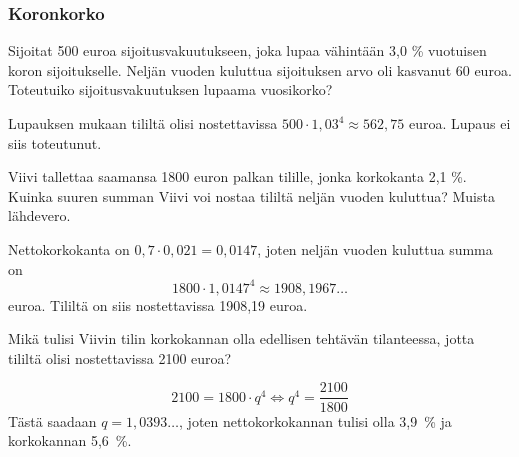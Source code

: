 \documentclass[a4paper,10pt]{article}\usepackage[]{graphicx}\usepackage[]{color}
\begin{document}
\subsubsection*{Koronkorko}

\begin{question} 
    Sijoitat 500 euroa sijoitusvakuutukseen, joka lupaa vähintään 3{,}0 \% vuotuisen koron sijoitukselle.
Neljän vuoden kuluttua sijoituksen arvo oli kasvanut 60 euroa. Toteutuiko sijoitusvakuutuksen lupaama vuosikorko?
\end{question}\begin{solution}
    Lupauksen mukaan tililtä olisi nostettavissa \(500\cdot1,03^4\approx562,75\) euroa. Lupaus ei siis toteutunut.
\end{solution}

\begin{question} 
    Viivi tallettaa saamansa 1800 euron palkan tilille, jonka korkokanta 2,1 \%. Kuinka suuren summan Viivi voi nostaa tililtä
neljän vuoden kuluttua? Muista lähdevero.
\end{question}
\begin{solution}
    Nettokorkokanta on \(0,7\cdot0,021 = 0,0147\),
    joten neljän vuoden kuluttua summa on
    \[
        1800\cdot1,0147^4\approx1908,1967\dots
    \]
    euroa. Tililtä on siis nostettavissa 1908,19 euroa.
\end{solution}

\begin{question} 
    Mikä tulisi Viivin tilin korkokannan olla edellisen tehtävän tilanteessa, jotta tililtä olisi nostettavissa 2100 euroa?
\end{question}\begin{solution}
    \[
        2100 = 1800\cdot q^4\Leftrightarrow q^4 = \frac{2100}{1800}
    \]
    Tästä saadaan \(q = 1,0393\dots\), joten nettokorkokannan tulisi olla 3,9~\% ja korkokannan 5,6~\%.
\end{solution}
\end{document}
